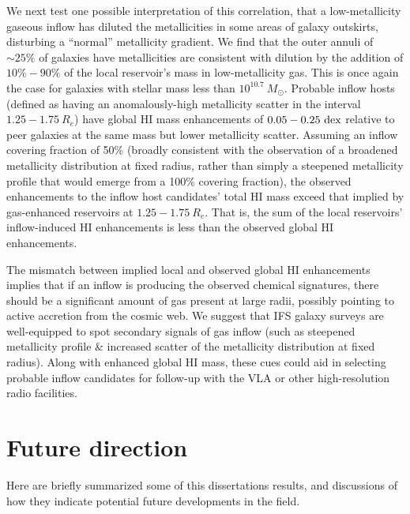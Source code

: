 We next test one possible interpretation of this correlation, that a low-metallicity gaseous inflow has diluted the metallicities in some areas of galaxy outskirts, disturbing a ``normal'' metallicity gradient. We find that the outer annuli of $\sim 25\%$ of galaxies have metallicities are consistent with dilution by the addition of $10\%-90\%$ of the local reservoir's mass in low-metallicity gas. This is once again the case for galaxies with stellar mass less than $10^{10.7} ~ M_{\odot}$. Probable inflow hosts (defined as having an anomalously-high metallicity scatter in the interval $1.25 - 1.75 ~ R_e$) have global HI mass enhancements of $0.05 - 0.25 ~ {\rm dex}$ relative to peer galaxies at the same mass but lower metallicity scatter. Assuming an inflow covering fraction of 50\% (broadly consistent with the observation of a broadened metallicity distribution at fixed radius, rather than simply a steepened metallicity profile that would emerge from a 100\% covering fraction), the observed enhancements to the inflow host candidates' total HI mass exceed that implied by gas-enhanced reservoirs at $1.25 - 1.75 ~ R_e$. That is, the sum of the local reservoirs' inflow-induced HI enhancements is less than the observed global HI enhancements.

The mismatch between implied local and observed global HI enhancements implies that if an inflow is producing the observed chemical signatures, there should be a significant amount of gas present at large radii, possibly pointing to active accretion from the cosmic web. We suggest that IFS galaxy surveys are well-equipped to spot secondary signals of gas inflow (such as steepened metallicity profile \& increased scatter of the metallicity distribution at fixed radius). Along with enhanced global HI mass, these cues could aid in selecting probable inflow candidates for follow-up with the VLA or other high-resolution radio facilities.

\section{Future direction}

Here are briefly summarized some of this dissertations results, and discussions of how they indicate potential future developments in the field.

